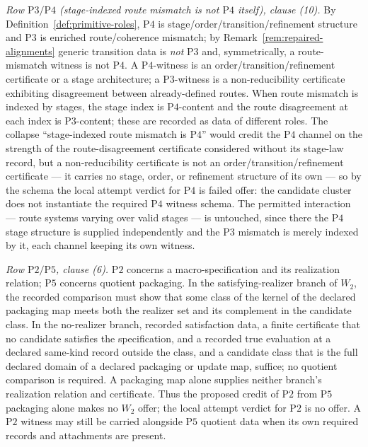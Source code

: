 \documentclass[11pt]{article}
\theoremstyle{definition}
\newcommand{\Ptwo}{\ensuremath{\mathrm{P2}}}
\newcommand{\Pthree}{\ensuremath{\mathrm{P3}}}
\newcommand{\Pfour}{\ensuremath{\mathrm{P4}}}
\newcommand{\Pfive}{\ensuremath{\mathrm{P5}}}
\begin{document}
\emph{Row \(\Pthree{}/\Pfour{}\) (stage-indexed route mismatch is not
\(\Pfour{}\) itself), clause (10).} By Definition~\ref{def:primitive-roles},
\Pfour{} is stage/order/transition/refinement structure and \Pthree{} is
enriched route/coherence mismatch; by Remark~\ref{rem:repaired-alignments}
generic transition data is \emph{not} \Pthree{} and, symmetrically, a
route-mismatch witness is not \Pfour{}. A \Pfour{}-witness is an
order/transition/refinement certificate or a stage architecture; a
\Pthree{}-witness is a non-reducibility certificate exhibiting disagreement
between already-defined routes. When route mismatch is indexed by stages, the
stage index is \Pfour{}-content and the route disagreement at each index is
\Pthree{}-content; these are recorded as data of different roles. The collapse
``stage-indexed route mismatch is \Pfour{}'' would credit the \Pfour{} channel
on the strength of the route-disagreement certificate considered without its
stage-law record, but a
non-reducibility certificate is not an order/transition/refinement certificate
--- it carries no stage, order, or refinement structure of its own --- so by the
schema the local attempt verdict for \Pfour{} is failed offer: the candidate
cluster does not instantiate the required \Pfour{} witness schema. The permitted
interaction --- route systems varying over valid stages --- is untouched, since
there the \Pfour{} stage structure is supplied independently and the \Pthree{}
mismatch is merely indexed by it, each channel keeping its own witness.

\emph{Row \(\Ptwo{}/\Pfive{}\), clause (6).} \Ptwo{} concerns a
macro-specification and its realization relation; \Pfive{} concerns
quotient packaging. In the satisfying-realizer branch of \(W_2\), the recorded
comparison must show that some class of the kernel of the declared packaging
map meets both the realizer set and its complement in the candidate class. In the no-realizer branch, recorded satisfaction data, a
finite certificate that no candidate satisfies the specification, and a
recorded true evaluation at a declared same-kind record outside the class,
and a candidate class that is the full declared domain of a declared
packaging or update map, suffice; no quotient comparison is required. A packaging map alone
supplies neither branch's realization relation and certificate. Thus the
proposed credit of \Ptwo{} from \Pfive{} packaging alone makes no \(W_2\)
offer; the local attempt verdict for \Ptwo{} is no offer. A
\Ptwo{} witness may still be carried alongside \Pfive{} quotient data when its
own required records and attachments are present.
\end{document}
